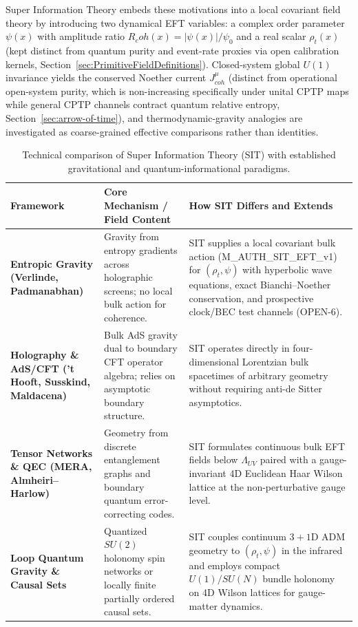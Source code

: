 \documentclass[american,11pt,letterpaper]{article}
\newcommand{\Rcoh}{R_{\mathrm{coh}}}
\def\mathrm#1{#1}%
\def\texttt#1{#1}%
\def\Rcoh{R_coh}%
\begin{document}
Super Information Theory embeds these motivations into a local covariant field theory by introducing two dynamical EFT variables: a complex order parameter $\psi(x)$ with amplitude ratio $\Rcoh(x) = |\psi(x)|/\psi_0$ and a real scalar $\rho_t(x)$ (kept distinct from quantum purity and event-rate proxies via open calibration kernels, Section~\ref{sec:PrimitiveFieldDefinitions}). Closed-system global $U(1)$ invariance yields the conserved Noether current $J^\mu_{\mathrm{coh}}$ (distinct from operational open-system purity, which is non-increasing specifically under unital CPTP maps while general CPTP channels contract quantum relative entropy, Section~\ref{sec:arrow-of-time}), and thermodynamic-gravity analogies are investigated as coarse-grained effective comparisons rather than identities.

\begin{table}[htbp]
\centering
\caption{Technical comparison of Super Information Theory (SIT) with established gravitational and quantum-informational paradigms.}
\label{tab:sit-framework-comparison}
\vspace{0.4em}
\small
\begin{tabular}{|p{3.2cm}|p{4.8cm}|p{6.8cm}|}
\hline
\textbf{Framework} & \textbf{Core Mechanism / Field Content} & \textbf{How SIT Differs and Extends} \\
\hline
\textbf{Entropic Gravity (Verlinde, Padmanabhan)} & Gravity from entropy gradients across holographic screens; no local bulk action for coherence. & SIT supplies a local covariant bulk action (\texttt{M\_AUTH\_SIT\_EFT\_v1}) for $(\rho_t, \psi)$ with hyperbolic wave equations, exact Bianchi--Noether conservation, and prospective clock/BEC test channels (\texttt{OPEN-6}). \\
\hline
\textbf{Holography \& AdS/CFT ('t Hooft, Susskind, Maldacena)} & Bulk AdS gravity dual to boundary CFT operator algebra; relies on asymptotic boundary structure. & SIT operates directly in four-dimensional Lorentzian bulk spacetimes of arbitrary geometry without requiring anti-de Sitter asymptotics. \\
\hline
\textbf{Tensor Networks \& QEC (MERA, Almheiri--Harlow)} & Geometry from discrete entanglement graphs and boundary quantum error-correcting codes. & SIT formulates continuous bulk EFT fields below $\Lambda_{\mathrm{UV}}$ paired with a gauge-invariant 4D Euclidean Haar Wilson lattice at the non-perturbative gauge level. \\
\hline
\textbf{Loop Quantum Gravity \& Causal Sets} & Quantized $SU(2)$ holonomy spin networks or locally finite partially ordered causal sets. & SIT couples continuum $3+1$D ADM geometry to $(\rho_t, \psi)$ in the infrared and employs compact $U(1)/SU(N)$ bundle holonomy on 4D Wilson lattices for gauge-matter dynamics. \\

\end{tabular}
\end{table}
\end{document}
